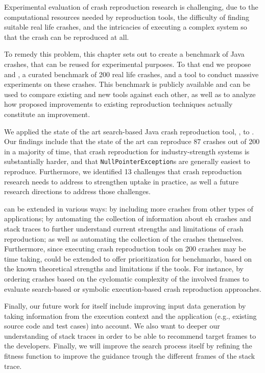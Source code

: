 Experimental evaluation of crash reproduction research is challenging, due to the computational resources needed by reproduction tools, the difficulty of finding suitable real life crashes, and the intricacies of executing a complex system so that the crash can be reproduced at all.

To remedy this problem, this chapter sets out to create a benchmark of Java crashes, that can be reused for experimental purposes.
To that end we propose \crashpack and \exrunner, a curated benchmark of 200 real life crashes, and a tool to conduct massive experiments on these crashes.
This benchmark is publicly available and can be used to compare existing and new tools against each other, as well as to analyze how proposed improvements to existing reproduction techniques actually constitute an improvement.

We applied the state of the art search-based Java crash reproduction tool, \evocrash, to \crashpack. Our findings include that the state of the art can reproduce 87 crashes out of 200 in a majority of time, that crash reproduction for industry-strength systems is substantially harder, and that \texttt{NullPointerException}s are generally easiest to reproduce. Furthermore, we identified 13 challenges that crash reproduction research needs to address to strengthen uptake in practice, as well a future research directions to address those challenges.

\crashpack  can be extended in various ways: by including more crashes from other types of applications; by automating the collection of information about eh crashes and stack traces to further understand current strengths and limitations of crash reproduction; as well as automating the collection of the crashes themselves. Furthermore, since executing crash reproduction tools on 200 crashes may be time taking, \crashpack could be extended to offer prioritization for benchmarks, based on the known theoretical strengths and limitations if the tools. For instance, by ordering crashes based on the cyclomatic complexity of the involved frames to evaluate search-based or symbolic execution-based crash reproduction approaches. 

Finally, our future work for \evocrash itself include improving input data generation by taking information from the execution context and the application (e.g., existing source code and test cases) into account. We also want to deeper our understanding of stack traces in order to be able to recommend target frames to the developers. Finally, we will improve the search process itself by refining the fitness function to improve the guidance trough the different frames of the stack trace.

